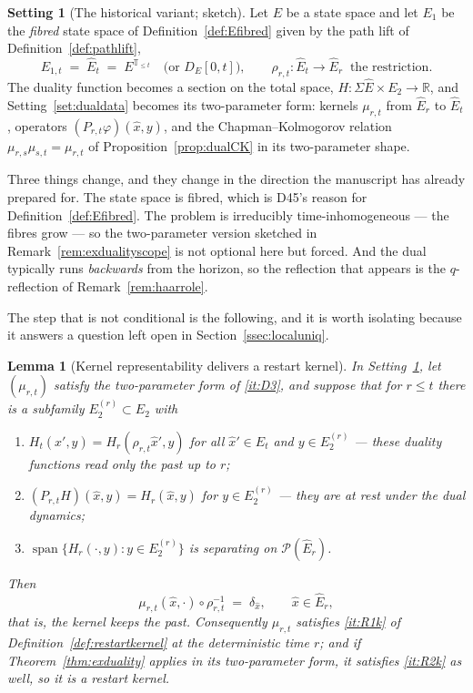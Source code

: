\documentclass[11pt,a4paper]{article}
\theoremstyle{plain}
\newtheorem{lemma}[theorem]{Lemma}
\theoremstyle{definition}
\newtheorem{setting}[theorem]{Setting}
\theoremstyle{remark}
\newcommand{\R}{\mathbb{R}}
\newcommand{\T}{\mathbb{T}}                     %
\newcommand{\Prob}{\mathcal{P}}                %
\begin{document}
\begin{setting}[The historical variant; sketch]
  \label{set:historical}
  Let $E$ be a state space and let $E_1$ be the \emph{fibred} state space of
  Definition~\ref{def:Efibred} given by the path lift of
  Definition~\ref{def:pathlift},
  \[
    E_{1,t} \;=\; \hat{E}_t \;=\; E^{\T_{\leq t}}
    \quad\text{(or } D_E[0,t] \text{)} ,
    \qquad
    \rho_{r,t} : \hat{E}_t \to \hat{E}_r \ \text{ the restriction} .
  \]
  The duality function becomes a section on the total space,
  $H : \Sigma\hat{E} \times E_2 \to \R$, and Setting~\ref{set:dualdata} becomes
  its two-parameter form: kernels $\mu_{r,t}$ from $\hat{E}_r$ to $\hat{E}_t$,
  operators $(P_{r,t}\varphi)(\hat{x},y)$, and the Chapman--Kolmogorov relation
  $\mu_{r,s}\mu_{s,t} = \mu_{r,t}$ of Proposition~\ref{prop:dualCK} in its
  two-parameter shape.
\end{setting}

Three things change, and they change in the direction the manuscript has already
prepared for.  The state space is fibred, which is D45's reason for
Definition~\ref{def:Efibred}.  The problem is irreducibly time-inhomogeneous ---
the fibres grow --- so the two-parameter version sketched in
Remark~\ref{rem:exdualityscope} is not optional here but forced.  And the dual
typically runs \emph{backwards} from the horizon, so the reflection that appears
is the $q$-reflection of Remark~\ref{rem:haarrole}.

The step that is not conditional is the following, and it is worth isolating
because it answers a question left open in Section~\ref{ssec:localuniq}.

\begin{lemma}[Kernel representability delivers a restart kernel]
  \label{lem:histrestart}
  In Setting~\ref{set:historical}, let $(\mu_{r,t})$ satisfy the two-parameter
  form of \ref{it:D3}, and suppose that for $r \leq t$ there is a subfamily
  $E_2^{(r)} \subset E_2$ with
  \begin{enumerate}[label=(\roman*)]
  \item \label{it:hist_past}
    $H_t(\hat{x}',y) = H_r(\rho_{r,t}\hat{x}',y)$ for all $\hat{x}' \in \hat{E}_t$
    and $y \in E_2^{(r)}$ --- these duality functions read only the past up to
    $r$;
  \item \label{it:hist_rest}
    $(P_{r,t}H)(\hat{x},y) = H_r(\hat{x},y)$ for $y \in E_2^{(r)}$ --- they are at
    rest under the dual dynamics;
  \item \label{it:hist_sep}
    $\operatorname{span}\{H_r(\cdot,y) : y \in E_2^{(r)}\}$ is separating on
    $\Prob(\hat{E}_r)$.
  \end{enumerate}
  Then
  \[
    \mu_{r,t}(\hat{x},\cdot) \circ \rho_{r,t}^{-1} \;=\; \delta_{\hat{x}} ,
    \qquad \hat{x} \in \hat{E}_r ,
  \]
  that is, \emph{the kernel keeps the past}.  Consequently $\mu_{r,t}$ satisfies
  \ref{it:R1k} of Definition~\ref{def:restartkernel} at the deterministic time
  $r$; and if Theorem~\ref{thm:exduality} applies in its two-parameter form, it
  satisfies \ref{it:R2k} as well, so it \emph{is} a restart kernel.
\end{lemma}
\end{document}
